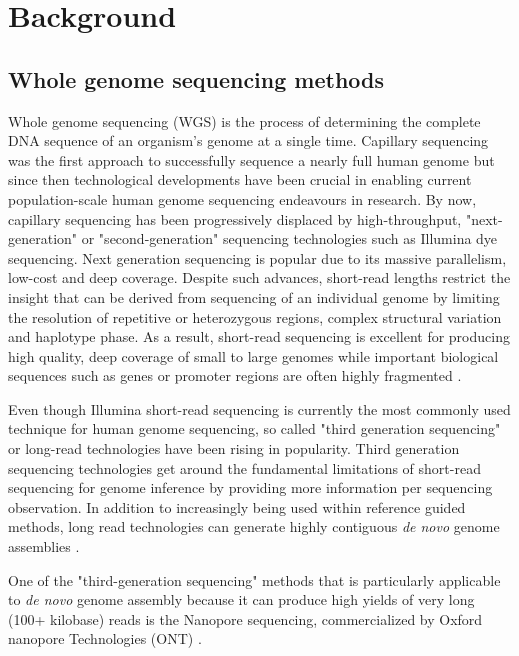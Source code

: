 \chapter{Background}

\section{Whole genome sequencing methods}
\label{sec:background:WGS}
Whole genome sequencing (WGS) is the process of determining the complete DNA sequence of an organism's genome at a single time. Capillary sequencing was the first approach to successfully sequence a nearly full human genome but since then technological developments have been crucial in enabling current population-scale human genome sequencing endeavours in research. By now, capillary sequencing has been progressively displaced by high-throughput, "next-generation" or "second-generation" sequencing technologies such as Illumina dye sequencing. Next generation sequencing is popular due to its massive parallelism, low-cost and deep coverage. Despite such advances, short-read lengths restrict the insight that can be derived from sequencing of an individual genome by limiting the resolution of repetitive or heterozygous regions, complex structural variation and haplotype phase. As a result, short-read sequencing is excellent for producing high quality, deep coverage of small to large genomes while important biological sequences such as genes or promoter regions are often highly fragmented \cite{alkan2011limitations}. 

Even though Illumina short-read sequencing is currently the most commonly used technique for human genome sequencing, so called "third generation sequencing" or long-read technologies have been rising in popularity. Third generation sequencing technologies get around the fundamental limitations of short-read sequencing for genome inference by providing more information per sequencing observation. In addition to increasingly being used within reference guided methods, long read technologies can generate highly contiguous \textit{de novo}  genome assemblies \cite{shafin2019efficient}. 

One of the "third-generation sequencing" methods that is particularly applicable to \textit{de novo} genome assembly because it can produce high yields of very long (100+ kilobase) reads is the Nanopore sequencing, commercialized by Oxford nanopore Technologies (ONT) \cite{jain2018nanopore}.

